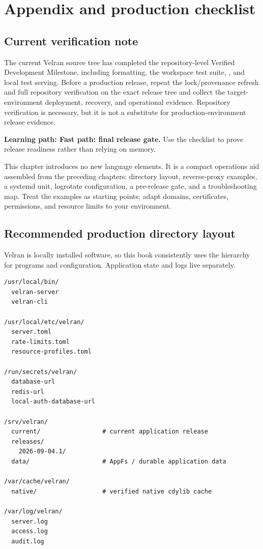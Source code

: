 

\chapter{Appendix and production checklist}

\section{Current verification note}

The current Velran source tree has completed the repository-level Verified Development Milestone, including formatting, the workspace test suite, , and local test serving. Before a production release, repeat the lock/provenance refresh and full repository verification on the exact release tree and collect the target-environment deployment, recovery, and operational evidence. Repository verification is necessary, but it is not a substitute for production-environment release evidence.

\noindent\textbf{Learning path: Fast path: final release gate.} Use the checklist to prove release readiness rather than relying on memory.\par\medskip

This chapter introduces no new language elements. It is a compact operations aid assembled from the preceding chapters: directory layout, reverse-proxy examples, a systemd unit, logrotate configuration, a pre-release gate, and a troubleshooting map. Treat the examples as starting points; adapt domains, certificates, permissions, and resource limits to your environment.

\section{Recommended production directory layout}

Velran is locally installed software, so this book consistently uses the  hierarchy for programs and configuration. Application state and logs live separately.

\begin{lstlisting}
/usr/local/bin/
  velran-server
  velran-cli

/usr/local/etc/velran/
  server.toml
  rate-limits.toml
  resource-profiles.toml

/run/secrets/velran/
  database-url
  redis-url
  local-auth-database-url

/srv/velran/
  current/                 # current application release
  releases/
    2026-09-04.1/
  data/                    # AppFs / durable application data

/var/cache/velran/
  native/                  # verified native cdylib cache

/var/log/velran/
  server.log
  access.log
  audit.log
\end{lstlisting}

